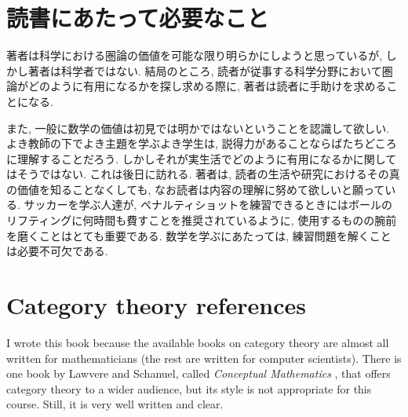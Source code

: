 \section{読書にあたって必要なこと}


著者は科学における圏論の価値を可能な限り明らかにしようと思っているが, しかし著者は科学者ではない. 結局のところ, 読者が従事する科学分野において圏論がどのように有用になるかを探し求める際に, 著者は読者に手助けを求めることになる. 


また, 一般に数学の価値は初見では明かではないということを認識して欲しい. よき教師の下でよき主題を学ぶよき学生は, 説得力があることならばたちどころに理解することだろう. しかしそれが実生活でどのように有用になるかに関してはそうではない. これは後日に訪れる. 著者は, 読者の生活や研究におけるその真の価値を知ることなくしても, なお読者は内容の理解に努めて欲しいと願っている. サッカーを学ぶ人達が, ペナルティショットを練習できるときにはボールのリフティングに何時間も費すことを推奨されているように, 使用するものの腕前を磨くことはとても重要である. 数学を学ぶにあたっては, 練習問題を解くことは必要不可欠である.


\section{Category theory references}

I wrote this book because the available books on category theory are almost all written for mathematicians (the rest are written for computer scientists). There is one book by Lawvere and Schanuel, called {\em Conceptual Mathematics} \cite{LS}, that offers category theory to a wider audience, but its style is not appropriate for this course. Still, it is very well written and clear. 

